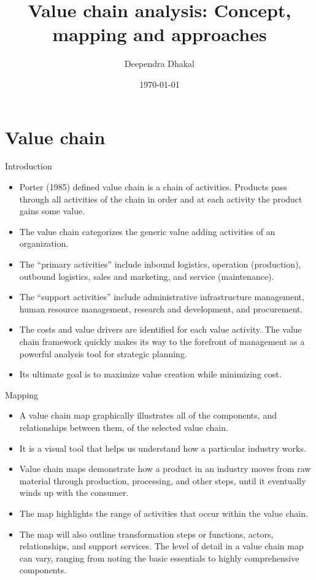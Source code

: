\documentclass[12pt,ignorenonframetext,aspectratio=169]{beamer}
\title{\insertsectionhead}
  {
    \definecolor{white}{rgb}{0.776,0.357,0.157}
    \definecolor{iqss@orange}{rgb}{1,1,1}
    \ifnum \insertmainframenumber > \insertframenumber
    \frame{
      \frametitle{\iqsssectiontitleheader}
      \tableofcontents[currentsection]
    }
    \else
    \frame{
      \frametitle{Backup Slides}
      \tableofcontents[sectionstyle=shaded/shaded,subsectionstyle=shaded/shaded/shaded]
    }
    \fi
  }
\title[]{Value chain analysis: Concept, mapping and approaches}
\author[
        Deependra Dhakal
    ]{Deependra Dhakal}
\institute[
    ]{
    GAASC, Baitadi \and Tribhuwan University
    }
\date[
      \today
  ]{
      \today
        }
\providecommand{\tightlist}{%
  \setlength{\itemsep}{0pt}\setlength{\parskip}{0pt}}
\begin{document}
  \begin{frame}[plain]
  \titlepage
  \end{frame}



\hypertarget{value-chain}{%
\section{Value chain}\label{value-chain}}

\begin{frame}{Introduction}
\protect\hypertarget{introduction}{}
\begin{itemize}
\tightlist
\item
  Porter (1985) defined value chain is a chain of activities. Products
  pass through all activities of the chain in order and at each activity
  the product gains some value.
\item
  The value chain categorizes the generic value adding activities of an
  organization.
\item
  The ``primary activities'' include inbound logistics, operation
  (production), outbound logistics, sales and marketing, and service
  (maintenance).
\item
  The ``support activities'' include administrative infrastructure
  management, human resource management, research and development, and
  procurement.
\item
  The costs and value drivers are identified for each value activity.
  The value chain framework quickly makes its way to the forefront of
  management as a powerful analysis tool for strategic planning.
\item
  Its ultimate goal is to maximize value creation while minimizing cost.
\end{itemize}
\end{frame}

\begin{frame}{Mapping}
\protect\hypertarget{mapping}{}
\begin{itemize}
\tightlist
\item
  A value chain map graphically illustrates all of the components, and
  relationships between them, of the selected value chain.
\item
  It is a visual tool that helps us understand how a particular industry
  works.
\item
  Value chain maps demonstrate how a product in an industry moves from
  raw material through production, processing, and other steps, until it
  eventually winds up with the consumer.
\item
  The map highlights the range of activities that occur within the value
  chain.
\item
  The map will also outline transformation steps or functions, actors,
  relationships, and support services. The level of detail in a value
  chain map can vary, ranging from noting the basic essentials to highly
  comprehensive components.
\end{itemize}
\end{frame}
\end{document}
